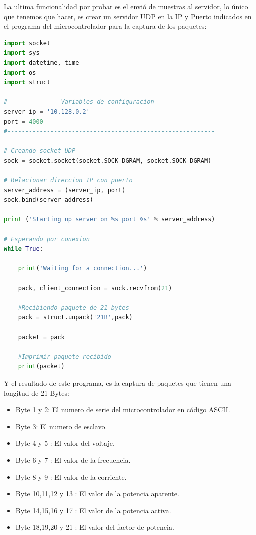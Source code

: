 La ultima funcionalidad por probar es el envió de muestras al servidor, lo único que tenemos que hacer, es crear un servidor UDP en la IP y Puerto indicados en el programa del microcontrolador para la captura de los paquetes:


\begin{lstlisting}[language=Python]
import socket
import sys
import datetime, time
import os
import struct

#---------------Variables de configuracion-----------------
server_ip = '10.128.0.2'
port = 4000
#----------------------------------------------------------

# Creando socket UDP
sock = socket.socket(socket.SOCK_DGRAM, socket.SOCK_DGRAM)

# Relacionar direccion IP con puerto
server_address = (server_ip, port)
sock.bind(server_address)

print ('Starting up server on %s port %s' % server_address)

# Esperando por conexion
while True:

    print('Waiting for a connection...')
    
    pack, client_connection = sock.recvfrom(21)

    #Recibiendo paquete de 21 bytes
    pack = struct.unpack('21B',pack)

    packet = pack

    #Imprimir paquete recibido
    print(packet)

\end{lstlisting}

Y el resultado de este programa, es la captura de paquetes que tienen una longitud de 21 Bytes:
\begin{itemize}
    \item Byte 1 y 2: El numero de serie del microcontrolador en código ASCII.
    \item Byte 3: El numero de esclavo.
    \item Byte 4 y 5 : El valor del voltaje.
    \item Byte 6 y 7 : El valor de la frecuencia.
    \item Byte 8 y 9 : El valor de la corriente.
    \item Byte 10,11,12 y 13 : El valor de la potencia aparente.
    \item Byte 14,15,16 y 17 : El valor de la potencia activa.
    \item Byte 18,19,20 y 21 : El valor del factor de potencia.
\end{itemize}

